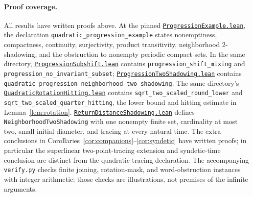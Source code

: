 \documentclass[11pt]{article}
\begin{document}
\paragraph{Proof coverage.}
\begingroup\small\raggedright
All results have written proofs above.
At the pinned \href{https://github.com/the-omega-institute/trureturing/blob/d9bb8a406783c5222849b798f3c2ab738f653d75/D5/S1/Dynamics/Shadowing/ProgressionExample.lean}{\texttt{ProgressionExample.lean}},
the declaration \texttt{quadratic\_\allowbreak progression\_\allowbreak example} states
nonemptiness, compactness, continuity, surjectivity, product
transitivity, neighborhood $2$-shadowing, and the obstruction to
nonempty periodic compact sets. In the same directory,
\href{https://github.com/the-omega-institute/trureturing/blob/d9bb8a406783c5222849b798f3c2ab738f653d75/D5/S1/Dynamics/Shadowing/ProgressionSubshift.lean}{\texttt{ProgressionSubshift.lean}}
contains \texttt{progression\_\allowbreak shift\_\allowbreak mixing} and
\texttt{progression\_\allowbreak no\_\allowbreak invariant\_\allowbreak subset};
\href{https://github.com/the-omega-institute/trureturing/blob/d9bb8a406783c5222849b798f3c2ab738f653d75/D5/S1/Dynamics/Shadowing/ProgressionTwoShadowing.lean}{\texttt{ProgressionTwoShadowing.lean}}
contains \texttt{quadratic\_\allowbreak progression\_\allowbreak neighborhood\_\allowbreak two\_\allowbreak shadowing}.
The same directory's
\href{https://github.com/the-omega-institute/trureturing/blob/d9bb8a406783c5222849b798f3c2ab738f653d75/D5/S1/Dynamics/Shadowing/QuadraticRotationHitting.lean}{\texttt{QuadraticRotationHitting.lean}}
contains \texttt{sqrt\_\allowbreak two\_\allowbreak scaled\_\allowbreak round\_\allowbreak lower}
and \texttt{sqrt\_\allowbreak two\_\allowbreak scaled\_\allowbreak quarter\_\allowbreak hitting},
the lower bound and hitting estimate in Lemma~\ref{lem:rotation}.
\href{https://github.com/the-omega-institute/trureturing/blob/d9bb8a406783c5222849b798f3c2ab738f653d75/D5/S1/Dynamics/Shadowing/ReturnDistanceShadowing.lean}{\texttt{ReturnDistanceShadowing.lean}}
defines \texttt{NeighborhoodTwoShadowing} with one nonempty finite
set, cardinality at most two, small initial diameter, and tracing
at every natural time.
The extra conclusions in Corollaries~\ref{cor:companions}--\ref{cor:syndetic}
have written proofs; in particular the superlinear two-point-tracing
extension and syndetic-time conclusion are distinct from the
quadratic tracing declaration.
The accompanying \texttt{verify.py} checks finite joining,
rotation-mask, and word-obstruction instances with integer arithmetic;
those checks are illustrations, not premises of the infinite arguments.
\par\endgroup
\end{document}
